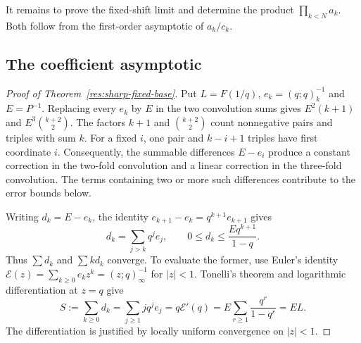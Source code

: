 \documentclass[11pt]{article}
\begin{document}
It remains to prove the fixed-shift limit and determine the product
$\prod_{k<N}a_k$. Both follow from the first-order asymptotic of
$a_k/c_k$.

\subsection{The coefficient asymptotic}\label{sec:coefficient-asymptotic}

\begin{proof}[Proof of Theorem~\ref{res:sharp-fixed-base}]
Put $L=F(1/q)$, $e_k=(q;q)_k^{-1}$ and $E=P^{-1}$.
Replacing every $e_k$ by $E$ in the two convolution sums gives
$E^2(k+1)$ and $E^3\binom{k+2}{2}$. The factors $k+1$ and $\binom{k+2}{2}$ count nonnegative pairs
and triples with sum $k$. For a fixed $i$, one pair and $k-i+1$
triples have first coordinate $i$. Consequently, the summable
differences $E-e_i$ produce a constant correction in the two-fold
convolution and a linear correction in the three-fold convolution.
The terms containing two or more such differences contribute to
the error bounds below.

Writing $d_k=E-e_k$, the identity
$e_{k+1}-e_k=q^{k+1}e_{k+1}$ gives
\[
 d_k=\sum_{j>k}q^je_j,\qquad
 0\le d_k\le\frac{E q^{k+1}}{1-q}.
\]
Thus $\sum d_k$ and $\sum k d_k$ converge. To evaluate the former,
use Euler's identity
$\mathcal E(z)=\sum_{k\ge0}e_kz^k=(z;q)_\infty^{-1}$ for $|z|<1$.
Tonelli's theorem and logarithmic differentiation at $z=q$ give
\[
 S:=\sum_{k\ge0}d_k
 =\sum_{j\ge1}j q^je_j
 =q\mathcal E'(q)
 =E\sum_{r\ge1}\frac{q^r}{1-q^r}=EL.
\]
The differentiation is justified by locally uniform convergence on
$|z|<1$.


\end{proof}
\end{document}
